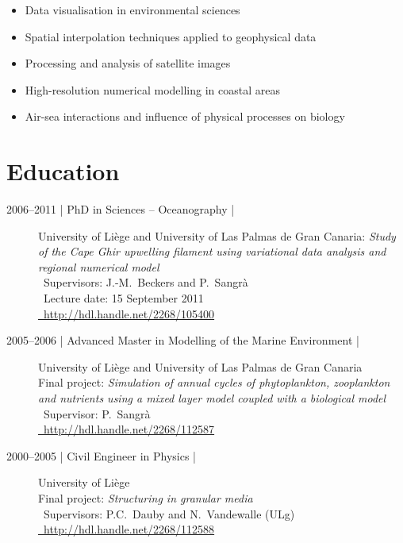 \documentclass[10pt,a4paper,svgnames]{article}
\begin{document}
\begin{itemize}
\item {Data visualisation in environmental sciences}
\item {Spatial interpolation techniques applied to geophysical data}
\item {Processing and analysis of satellite images}
\item {High-resolution numerical modelling in coastal areas}
\item {Air-sea interactions and influence of physical processes on biology}
\end{itemize}
%


\section{Education}

\begin{description}
\item[2006--2011 | PhD in Sciences -- Oceanography |] University of Li\`{e}ge and University of Las Palmas de Gran Canaria: \emph{Study of the Cape Ghir upwelling filament using variational data analysis and regional numerical model}\\
\faUser~Supervisors: J.-M.~Beckers and P.~Sangr\`{a}\\
\faCalendar~Lecture date: 15 September 2011\\
\href{http://hdl.handle.net/2268/105400}{\faLink~http://hdl.handle.net/2268/105400}

\item[2005--2006 | Advanced Master in Modelling of the Marine Environment |] University of Li\`{e}ge and University of Las Palmas de Gran Canaria\\
Final project: \emph{Simulation of annual cycles of phytoplankton, zooplankton and nutrients using a mixed layer model coupled with a biological model}\\
\faUser~Supervisor: P.~Sangr\`{a}\\
\href{http://hdl.handle.net/2268/112587}{\faLink~http://hdl.handle.net/2268/112587}

\item[2000--2005 | Civil Engineer in Physics | ] University of Li\`{e}ge\\
Final project: \emph{Structuring in granular media}\\
\faUser~Supervisors: P.C.~Dauby and N.~Vandewalle (ULg)\\
\href{http://hdl.handle.net/2268/112588}{\faLink~http://hdl.handle.net/2268/112588}


\end{description}
\end{document}
